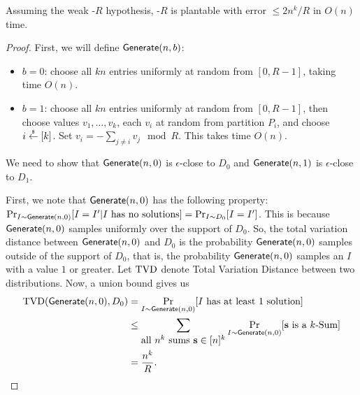\begin{theorem}
	Assuming the weak \kSum-$R$ hypothesis, \kSum-$R$ is plantable with error $\leq 2n^k/R$ in $O(n)$ time.
	\label{thm:ksumPlantable}
\end{theorem}
\begin{proof}
	First, we will define $\mathsf{Generate}(n,b)$:
	\begin{itemize}
		\item $b = 0$: choose all $kn$ entries uniformly at random from $[0,R-1]$, taking time $O(n)$.
		\item $b = 1$: choose all $kn$ entries uniformly at random from $[0,R-1]$, then choose values $v_1, \dots, v_k$, each $v_i$ at random from partition $P_i$, and choose $i \stackrel{\scriptscriptstyle{\$}}{\gets} [k]$. Set $v_i = - \sum_{j \neq i} v_j \mod R$. This takes time $O(n)$.
	\end{itemize}
	
	We need to show that $\mathsf{Generate}(n,0)$ is $\epsilon$-close to $D_0$ and $\mathsf{Generate}(n,1)$ is $\epsilon$-close to $D_1$.
	
	First, we note that $\mathsf{Generate}(n,0)$ has the following property: $\Pr_{I \sim \mathsf{Generate}(n,0)}[I = I' | I\mbox{ has no solutions} ] = \Pr_{I \sim D_0}[I = I']$. This is because $\mathsf{Generate}(n,0)$ samples uniformly over the support of $D_0$. So, the total variation distance between $\mathsf{Generate}(n,0)$ and $D_0$ is the probability $\mathsf{Generate}(n,0)$ samples outside of the support of $D_0$, that is, the probability $\mathsf{Generate}(n,0)$ samples an $I$ with a value $1$ or greater. Let $\mathrm{TVD}$ denote Total Variation Distance between two distributions. Now, a union bound gives us
	\begin{align*}
	\mathrm{TVD}(\mathsf{Generate}(n,0), D_0) &= \Pr_{I \sim \mathsf{Generate}(n,0)}[I \mbox{ has at least 1 solution} ]\\ 
	&\le \sum_{\mbox{all $n^k$ sums $\mathbf s \in [n]^k$}} \Pr_{I \sim \mathsf{Generate}(n,0)}[\mbox{$\mathbf s$ is a $k$-Sum}]\\
	&= \frac{n^k}{R}.
	\end{align*}
	

\end{proof}
